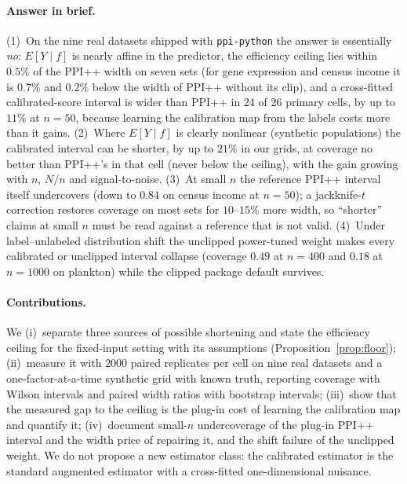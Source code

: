 \paragraph{Answer in brief.} (1)~On the nine real datasets shipped with \texttt{ppi-python} the answer is essentially \emph{no}: $E[Y\mid f]$ is nearly affine in the predictor, the efficiency ceiling lies within $0.5\%$ of the PPI++ width on seven sets (for gene expression and census income it is $0.7\%$ and $0.2\%$ below the width of PPI++ without its clip), and a cross-fitted calibrated-score interval is wider than PPI++ in 24 of 26 primary cells, by up to $11\%$ at $n=50$, because learning the calibration map from the labels costs more than it gains. (2)~Where $E[Y\mid f]$ is clearly nonlinear (synthetic populations) the calibrated interval can be shorter, by up to $21\%$ in our grids, at coverage no better than PPI++'s in that cell (never below the ceiling), with the gain growing with $n$, $N/n$ and signal-to-noise. (3)~At small $n$ the reference PPI++ interval itself undercovers (down to $0.84$ on census income at $n=50$); a jackknife-$t$ correction restores coverage on most sets for $10$--$15\%$ more width, so ``shorter'' claims at small $n$ must be read against a reference that is not valid. (4)~Under label--unlabeled distribution shift the unclipped power-tuned weight makes every calibrated or unclipped interval collapse (coverage $0.49$ at $n=400$ and $0.18$ at $n=1000$ on plankton) while the clipped package default survives.

\paragraph{Contributions.} We (i)~separate three sources of possible shortening and state the efficiency ceiling for the fixed-input setting with its assumptions (Proposition~\ref{prop:floor}); (ii)~measure it with $2000$ paired replicates per cell on nine real datasets and a one-factor-at-a-time synthetic grid with known truth, reporting coverage with Wilson intervals and paired width ratios with bootstrap intervals; (iii)~show that the measured gap to the ceiling is the plug-in cost of learning the calibration map and quantify it; (iv)~document small-$n$ undercoverage of the plug-in PPI++ interval and the width price of repairing it, and the shift failure of the unclipped weight. We do not propose a new estimator class: the calibrated estimator is the standard augmented estimator with a cross-fitted one-dimensional nuisance.

